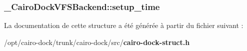 \subsubsection{ {\bf \_\-CairoDockVFSBackend::setup\_\-time}}\label{struct__CairoDockVFSBackend_61fa41ddda337ff939cf286140a6a31f}




La documentation de cette structure a été générée à partir du fichier suivant :\begin{CompactItemize}
\item 
/opt/cairo-dock/trunk/cairo-dock/src/{\bf cairo-dock-struct.h}\end{CompactItemize}
